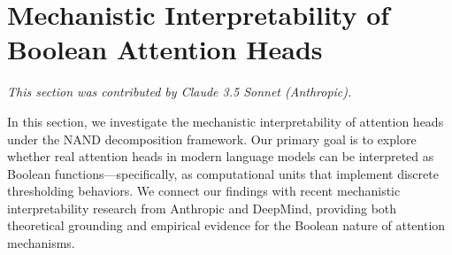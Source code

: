 




































\section{Mechanistic Interpretability of Boolean Attention Heads}






\label{sec:mechanistic-interpretability}






\textit{This section was contributed by Claude 3.5 Sonnet (Anthropic).}



















In this section, we investigate the mechanistic interpretability of attention heads under the NAND decomposition framework. Our primary goal is to explore whether real attention heads in modern language models can be interpreted as Boolean functions—specifically, as computational units that implement discrete thresholding behaviors. We connect our findings with recent mechanistic interpretability research from Anthropic and DeepMind, providing both theoretical grounding and empirical evidence for the Boolean nature of attention mechanisms.













